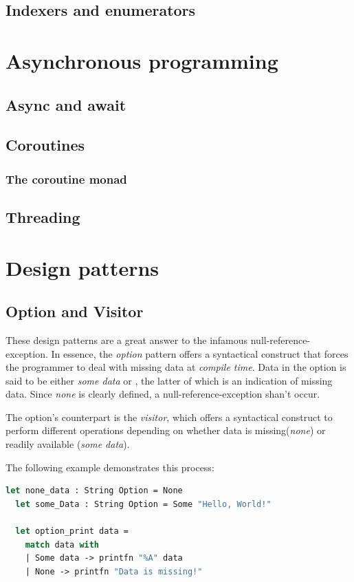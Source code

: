\documentclass{article}
\begin{document}
\subsection{Indexers and enumerators}

\newpage

\section{Asynchronous programming}
\subsection{Async and await}
\subsection{Coroutines}
\subsubsection{The coroutine monad}
\subsection{Threading}

\newpage

\section{Design patterns}

\subsection{Option and Visitor}
These design patterns are a great answer to the infamous null-reference-exception.
In essence, the {\em option} pattern offers a syntactical construct that forces the programmer to deal with missing data at {\em compile time}.
Data in the option is said to be either {\em some data} or {\none}, the latter of which is an indication of missing data.
Since {\em none} is clearly defined, a null-reference-exception shan't occur.

The option's counterpart is the {\em visitor}, which offers a syntactical construct to perform different operations depending on whether data
is missing({\em none}) or readily available ({\em some data}).

The following example demonstrates this process:

\begin{lstlisting}[language=Fsharp]
  let none_data : String Option = None
  let some_Data : String Option = Some "Hello, World!"

  let option_print data =
    match data with
    | Some data -> printfn "%A" data
    | None -> printfn "Data is missing!"
\end{lstlisting}
\end{document}
